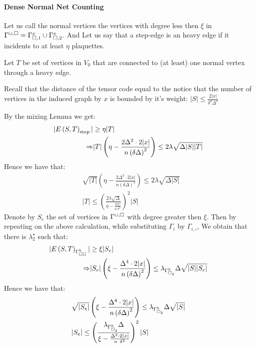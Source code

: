 \documentclass{article}
\begin{document}
\begin{multicols*}{2}
\paragraph{Dense Normal Net Counting} Let us call the normal vertices the vertices with degree less then $\xi$ in $\Gamma^{\cup, \square} = \Gamma_{\square, 1}^{x} \cup \Gamma_{\square, 2}^{x}$. 
And Let us say that a step-edge is an heavy edge if it incidents to at least $\eta$ plaquettes.

Let $ T$ be set of vertices in $V_0$ that are connected to (at least) one normal vertex through a heavy edge.  

    Recall that the distance of the tensor code equal to the   notice that the number of vertices in the induced graph by $x$ is bounded by it's weight:
    $ |S| \le \frac{2|x|}{ \delta^{2}\Delta^{2} }$ 

    By the mixing Lemma we get:  
    \begin{equation*}
      \begin{split}
	| E\left( S,T \right)_{\text{step}} | & \ge \eta |T| \\ 
	\Rightarrow  & |T|\left( \eta - \frac{2\Delta^{2}\cdot 2|x|}{n\left( \delta\Delta \right)^{2}}  \right) \le  2 \lambda\sqrt{\Delta|S||T|} 
      \end{split}
    \end{equation*}
    Hence we have that:
    \begin{equation*}
      \begin{split}
	& \sqrt{|T|}\left( \eta - \frac{2\Delta^{2}\cdot 2|x|}{n\left( \delta\Delta \right)^{2}}  \right) \le   2\lambda\sqrt{\Delta|S|} \\ 
	& |T| \le \left( \frac{ 2\lambda\sqrt{\Delta}}{\eta - \frac{4 |x|}{n\ \delta^{2}} } \right)^{2} |S|	
      \end{split}
    \end{equation*}
    Denote by $S_{e}$ the set of vertices in $\Gamma^{\cup, \square}$ with degree greater then $\xi$. Then by repeating on the above calculation, while substituting $\Gamma_{i}$ by $\Gamma_{i, \square}$, We obtain that there is $\lambda^{\star}_{2}$ such that:
     \begin{equation*}
      \begin{split}
	| E\left( S,T \right)_{\Gamma_{\square \square }^{h}} | & \ge \xi |S_{e}| \\ 
	\Rightarrow  & |S_{e}|\left( \xi - \frac{\Delta^{4}\cdot 2|x|}{n\left( \delta\Delta \right)^{2}}  \right) \le   \lambda_{\Gamma_{\square_{2}}^{h}}\Delta\sqrt{|S||S_{e}|} 
      \end{split}
    \end{equation*}
    Hence we have that:
    \begin{equation*}
      \begin{split}
	& \sqrt{|S_{e}|}\left( \xi - \frac{\Delta^{4}\cdot 2|x|}{n\left( \delta\Delta \right)^{2}}  \right) \le   \lambda_{\Gamma_{\square_{2}}^{h}}\Delta\sqrt{|S|} \\ 
	& |S_{e}| \le \left( \frac{ \lambda_{\Gamma_{\square_{2}}^{h}}\Delta}{\xi - \frac{\Delta^{2}\cdot 2|x|}{n\ \delta^{2}} } \right)^{2} |S|	
      \end{split}
    \end{equation*}


\end{multicols*}
\end{document}
